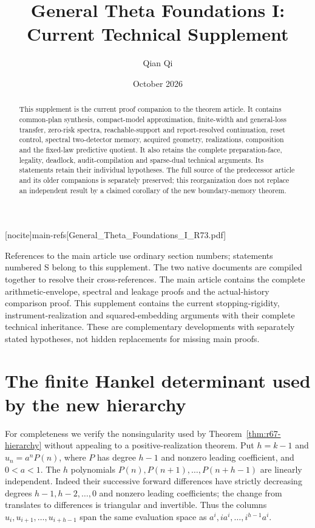 
[nocite]{main-refs}[General_Theta_Foundations_I_R73.pdf]
\renewcommand{\thesection}{S\arabic{section}}
\title[Current technical supplement]{General Theta Foundations I:\\Current Technical Supplement}
\author{Qian Qi}\date{October 2026}

\begin{abstract}
This supplement is the current proof companion to the theorem article. It contains common-plan synthesis, compact-model approximation, finite-width and general-loss transfer, zero-risk spectra, reachable-support and report-resolved continuation, reset control, spectral two-detector memory, acquired geometry, realizations, composition and the fixed-law predictive quotient. It also retains the complete preparation-face, legality, deadlock, audit-compilation and sparse-dual technical arguments. Its statements retain their individual hypotheses. The full source of the predecessor article and its older companions is separately preserved; this reorganization does not replace an independent result by a claimed corollary of the new boundary-memory theorem.
\end{abstract}
\maketitle
\enlargethispage{3pt}
\noindent References to the main article use ordinary section numbers; statements numbered S belong to this supplement. The two native documents are compiled together to resolve their cross-references. The main article contains the complete arithmetic-envelope, spectral and leakage proofs and the actual-history comparison proof. This supplement contains the current stopping-rigidity, instrument-realization and squared-embedding arguments with their complete technical inheritance. These are complementary developments with separately stated hypotheses, not hidden replacements for missing main proofs.





\section{The finite Hankel determinant used by the new hierarchy}\label{sec:r67-determinant}
For completeness we verify the nonsingularity used by Theorem~\ref{thm:r67-hierarchy} without appealing to a positive-realization theorem. Put $h=k-1$ and $u_n=a^nP(n)$, where $P$ has degree $h-1$ and nonzero leading coefficient, and $0<a<1$. The $h$ polynomials $P(n),P(n+1),\ldots,P(n+h-1)$ are linearly independent. Indeed their successive forward differences have strictly decreasing degrees $h-1,h-2,\ldots,0$ and nonzero leading coefficients; the change from translates to differences is triangular and invertible. Thus the columns $u_i,u_{i+1},\ldots,u_{i+h-1}$ span the same evaluation space as $a^i,i a^i,\ldots,i^{h-1}a^i$.

